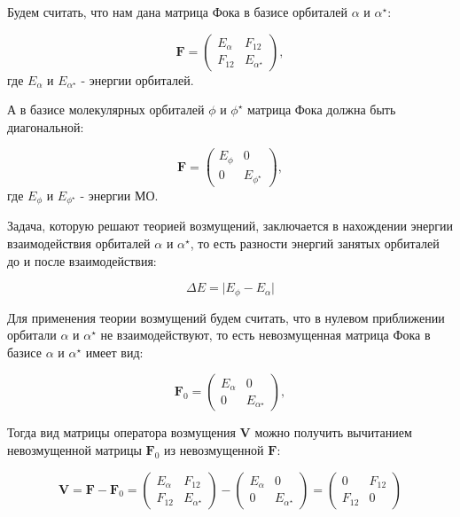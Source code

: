 \documentclass{article}
\begin{document}
Будем считать, что нам дана матрица Фока в базисе орбиталей $\alpha$ и $\alpha^\star$:

\begin{equation}
    \textbf{F} = 
    \begin{pmatrix}
        E_{\alpha} & F_{12} \\
        F_{12} & E_{\alpha^{\star}}
    \end{pmatrix},
\end{equation}
где $E_{\alpha}$ и $E_{\alpha^{\star}}$ - энергии орбиталей.

А в базисе молекулярных орбиталей $\phi$ и $\phi^{\star}$ матрица Фока должна быть диагональной:

\begin{equation}
    \textbf{F} = 
    \begin{pmatrix}
        E_{\phi} & 0 \\
        0 & E_{\phi^{\star}}
    \end{pmatrix},
\end{equation}
где $E_{\phi}$ и $E_{\phi^{\star}}$ - энергии МО.

Задача, которую решают теорией возмущений, заключается в нахождении энергии взаимодействия орбиталей $\alpha$ и $\alpha^\star$, то есть разности энергий занятых орбиталей до и после взаимодействия:

\begin{equation}
    \Delta E = \vert E_{\phi} - E_{\alpha} \vert
\end{equation}

Для применения теории возмущений будем считать, что в нулевом приближении орбитали $\alpha$ и $\alpha^\star$ не взаимодействуют, то есть невозмущенная матрица Фока в базисе $\alpha$ и $\alpha^\star$ имеет вид:

\begin{equation}
    \textbf{F}_{0} = 
    \begin{pmatrix}
        E_{\alpha} & 0 \\
        0 & E_{\alpha^{\star}}
    \end{pmatrix},
\end{equation}

Тогда вид матрицы оператора возмущения $\textbf{V}$ можно получить вычитанием невозмущенной матрицы $\textbf{F}_0$ из невозмущенной $\textbf{F}$:

\begin{equation}
    \textbf{V} = 
    \textbf{F} - \textbf{F}_0 =
    \begin{pmatrix}
        E_{\alpha} & F_{12} \\
        F_{12} & E_{\alpha^{\star}}
    \end{pmatrix}
    -
    \begin{pmatrix}
        E_{\alpha} & 0 \\
        0 & E_{\alpha^{\star}}
    \end{pmatrix}
    =
    \begin{pmatrix}
        0 & F_{12} \\
        F_{12} & 0
    \end{pmatrix}
\end{equation}
\end{document}
